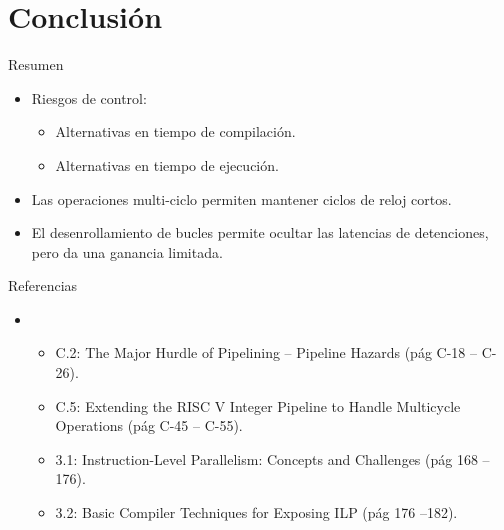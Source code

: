 \section{Conclusión}

\begin{frame}[t]{Resumen}
\begin{itemize}
  \item Riesgos de control:
    \begin{itemize}
      \item Alternativas en tiempo de compilación.
      \item Alternativas en tiempo de ejecución.
    \end{itemize}

  \item Las operaciones multi-ciclo permiten mantener ciclos de reloj cortos.

  \item El desenrollamiento de bucles permite ocultar las latencias de detenciones, pero da una ganancia limitada.

\end{itemize}
\end{frame}


\begin{frame}[t]{Referencias}
\begin{itemize}
  \item \bibhennessy
    \begin{itemize}
      \item C.2: The Major Hurdle of Pipelining -- Pipeline Hazards (pág C-18 -- C-26).
      \item C.5: Extending the RISC V Integer Pipeline to Handle Multicycle Operations (pág C-45 -- C-55).
      \item 3.1: Instruction-Level Parallelism: Concepts and Challenges (pág 168 -- 176).
      \item 3.2: Basic Compiler Techniques for Exposing ILP (pág 176 --182).
    \end{itemize}

\end{itemize}
\end{frame}
